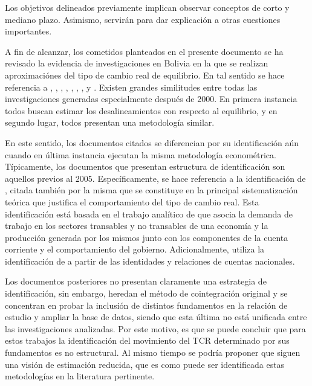 \documentclass[12pt,letterpaper]{article}
\begin{document}
Los objetivos delineados previamente implican observar conceptos de corto y mediano plazo. Asimismo, servirán para dar explicación a otras cuestiones importantes.


A fin de alcanzar, los cometidos planteados en el presente documento se ha revisado la evidencia de investigaciones en Bolivia en la que se realizan aproximaciónes del tipo de cambio real de equilibrio. En tal sentido se hace referencia a \cite{ferrufino1992tipo}, \cite{aguilar2003estimacion}, \cite{humerez2005reexaminando}, \cite{montiel2007equilibrium}, \cite{cerutti2008}, \cite{mendieta2008equilibrio}, \cite{bello2010tipo}, \cite{cerezo2010desempeno} y \cite{cerezo2011tipo}. Existen grandes similitudes entre todas las investigaciones generadas especialmente después de 2000. En primera instancia todos buscan estimar los desalineamientos con respecto al equilibrio, y en segundo lugar, todos presentan una metodología similar.

En este sentido, los documentos citados se diferencian por su identificación aún cuando en última instancia ejecutan la misma metodología econométrica. Típicamente, los documentos que presentan estructura de identificación son aquellos previos al 2005. Específicamente, se hace referencia a la identificación de \cite{lora2000tipo}, citada también por \cite{aguilar2003estimacion} la misma que se constituye en la principal sistematización teórica que justifica el comportamiento del tipo de cambio real. Esta identificación está basada en el trabajo analítico de \cite{hinkle1999exchange} que asocia la demanda de trabajo en los sectores transables y no transables de una economía y la producción generada por los mismos junto con los componentes de la cuenta corriente y el comportamiento del gobierno. Adicionalmente, \cite{humerez2005reexaminando} utiliza la identificación de \cite{elbadawi1994estimating} a partir de las identidades y relaciones de cuentas nacionales. 

Los documentos posteriores no presentan claramente una estrategia de identificación, sin embargo, heredan el método de cointegración original y se concentran en probar la inclusión de distintos fundamentos en la relación de estudio y ampliar la base de datos, siendo que esta última no está unificada entre las investigaciones analizadas. Por este motivo, es que se puede concluir que para estos trabajos la identificación del movimiento del TCR determinado por sus fundamentos es no estructural. Al mismo tiempo se podría proponer que siguen una visión de estimación reducida, que es como puede ser identificada estas metodologías en la literatura pertinente.
\end{document}
